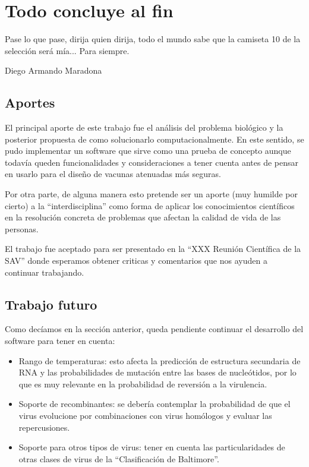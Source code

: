 \chapter{Todo concluye al fin}
\epigraph{Pase lo que pase, dirija quien dirija, todo el mundo sabe que la
camiseta 10 de la selecci\'on ser\'a m\'ia... Para siempre.}%
{Diego Armando Maradona}

\section{Aportes}

El principal aporte de este trabajo fue el an\'alisis del problema biol\'ogico y
la posterior propuesta de como solucionarlo computacionalmente. En este sentido,
se pudo implementar un software que sirve como una prueba de concepto aunque
todav\'ia queden funcionalidades y consideraciones a tener cuenta antes de
pensar en usarlo para el dise\~no de vacunas atenuadas m\'as seguras.

Por otra parte, de alguna manera esto pretende ser un aporte (muy humilde por
cierto) a la ``interdisciplina'' como forma de aplicar los conocimientos
cient\'ificos en la resoluci\'on concreta de problemas que afectan la calidad de
vida de las personas.

El trabajo fue aceptado para ser presentado en la ``XXX Reuni\'on Cient\'ifica
de la \ac{SAV}'' donde esperamos obtener criticas y comentarios que nos ayuden
a continuar trabajando.

\section{Trabajo futuro}

Como dec\'iamos en la secci\'on anterior, queda pendiente continuar el
desarrollo del software para tener en cuenta:
\begin{itemize}
 \item Rango de temperaturas: esto afecta la predicci\'on de estructura
secundaria de \ac{RNA} y las probabilidades de mutaci\'on entre las bases de
nucle\'otidos, por lo que es muy relevante en la probabilidad de reversi\'on a
la virulencia.
 \item Soporte de recombinantes: se deber\'ia contemplar la probabilidad de que
el virus evolucione por combinaciones con virus hom\'ologos y evaluar las
repercusiones.
 \item Soporte para otros tipos de virus: tener en cuenta las particularidades
de otras clases de virus de la ``Clasificaci\'on de Baltimore''.
\end{itemize}

